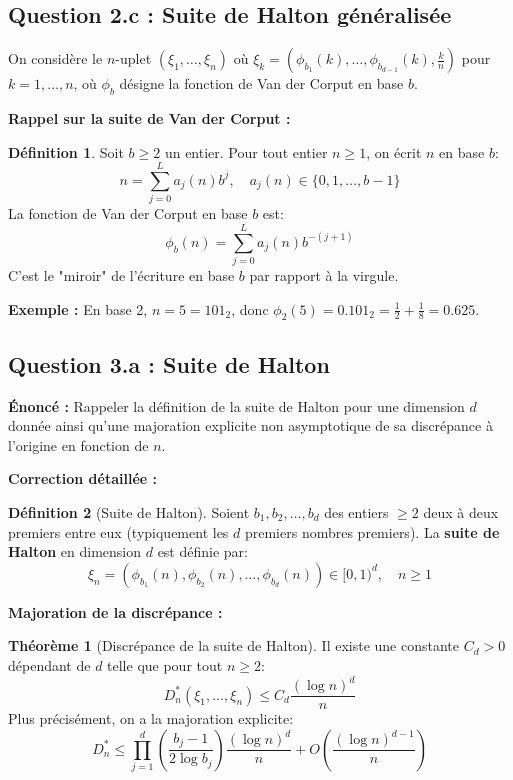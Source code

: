 \documentclass[12pt,a4paper]{article}
\theoremstyle{definition}
\newtheorem{definition}{Définition}[section]
\newtheorem{theorem}{Théorème}[section]
\begin{document}
\subsection{Question 2.c : Suite de Halton généralisée}

On considère le $n$-uplet $(\xi_1, \ldots, \xi_n)$ où $\xi_k = (\phi_{b_1}(k), \ldots, \phi_{b_{d-1}}(k), \frac{k}{n})$ pour $k = 1, \ldots, n$, où $\phi_b$ désigne la fonction de Van der Corput en base $b$.

\textbf{Rappel sur la suite de Van der Corput :}

\begin{definition}
Soit $b \geq 2$ un entier. Pour tout entier $n \geq 1$, on écrit $n$ en base $b$:
\[
n = \sum_{j=0}^{L} a_j(n) b^j, \quad a_j(n) \in \{0, 1, \ldots, b-1\}
\]
La fonction de Van der Corput en base $b$ est:
\[
\phi_b(n) = \sum_{j=0}^{L} a_j(n) b^{-(j+1)}
\]
C'est le "miroir" de l'écriture en base $b$ par rapport à la virgule.
\end{definition}

\textbf{Exemple :} En base 2, $n = 5 = 101_2$, donc $\phi_2(5) = 0.101_2 = \frac{1}{2} + \frac{1}{8} = 0.625$.

\subsection{Question 3.a : Suite de Halton}

\textbf{Énoncé :} Rappeler la définition de la suite de Halton pour une dimension $d$ donnée ainsi qu'une majoration explicite non asymptotique de sa discrépance à l'origine en fonction de $n$.

\textbf{Correction détaillée :}

\begin{definition}[Suite de Halton]
Soient $b_1, b_2, \ldots, b_d$ des entiers $\geq 2$ deux à deux premiers entre eux (typiquement les $d$ premiers nombres premiers). La \textbf{suite de Halton} en dimension $d$ est définie par:
\[
\xi_n = \left( \phi_{b_1}(n), \phi_{b_2}(n), \ldots, \phi_{b_d}(n) \right) \in [0,1)^d, \quad n \geq 1
\]
\end{definition}

\textbf{Majoration de la discrépance :}

\begin{theorem}[Discrépance de la suite de Halton]
Il existe une constante $C_d > 0$ dépendant de $d$ telle que pour tout $n \geq 2$:
\[
D_n^*(\xi_1, \ldots, \xi_n) \leq C_d \frac{(\log n)^d}{n}
\]
Plus précisément, on a la majoration explicite:
\[
D_n^* \leq \prod_{j=1}^{d} \left( \frac{b_j - 1}{2 \log b_j} \right) \frac{(\log n)^d}{n} + O\left( \frac{(\log n)^{d-1}}{n} \right)
\]
\end{theorem}
\end{document}
